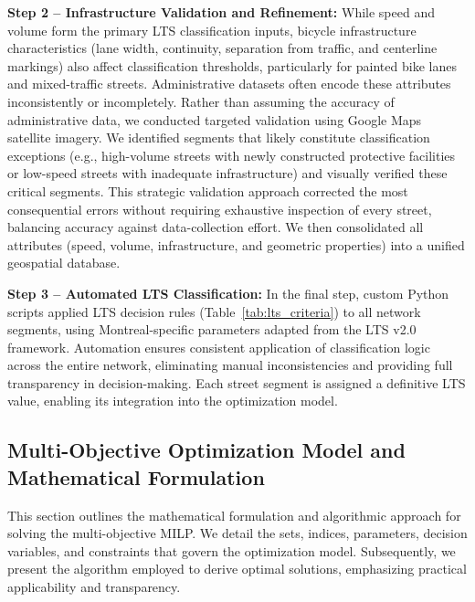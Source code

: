 \documentclass[preprint,authoryear,10pt]{elsarticle}
\begin{document}
\textbf{Step 2 -- Infrastructure Validation and Refinement:} While speed and volume form the primary LTS classification inputs, bicycle infrastructure characteristics (lane width, continuity, separation from traffic, and centerline markings) also affect classification thresholds, particularly for painted bike lanes and mixed-traffic streets. Administrative datasets often encode these attributes inconsistently or incompletely. Rather than assuming the accuracy of administrative data, we conducted targeted validation using Google Maps satellite imagery. We identified segments that likely constitute classification exceptions (e.g., high-volume streets with newly constructed protective facilities or low-speed streets with inadequate infrastructure) and visually verified these critical segments. This strategic validation approach corrected the most consequential errors without requiring exhaustive inspection of every street, balancing accuracy against data-collection effort. We then consolidated all attributes (speed, volume, infrastructure, and geometric properties) into a unified geospatial database.
 
\textbf{Step 3 -- Automated LTS Classification:} In the final step, custom Python scripts applied LTS decision rules (Table~\ref{tab:lts_criteria}) to all network segments, using Montreal-specific parameters adapted from the LTS v2.0 framework. Automation ensures consistent application of classification logic across the entire network, eliminating manual inconsistencies and providing full transparency in decision-making. Each street segment is assigned a definitive LTS value, enabling its integration into the optimization model. 

\subsection{Multi-Objective Optimization Model and Mathematical Formulation}

This section outlines the mathematical formulation and algorithmic approach for solving the multi-objective MILP.
We detail the sets, indices, parameters, decision variables, and constraints that govern the optimization model.
Subsequently, we present the algorithm employed to derive optimal solutions, emphasizing practical applicability and transparency.

\end{document}

